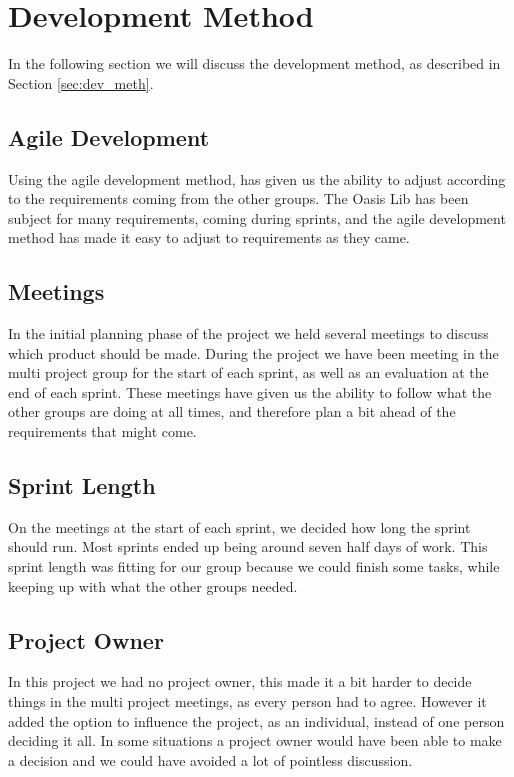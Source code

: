 \section{Development Method}
In the following section we will discuss the development method, as described in Section \vref{sec:dev_meth}.

\subsection{Agile Development}
Using the agile development method, has given us the ability to adjust according to the requirements coming from the other groups.
The Oasis Lib has been subject for many requirements, coming during sprints, and the agile development method has made it easy to adjust to requirements as they came.

\subsection{Meetings}
In the initial planning phase of the project we held several meetings to discuss which product should be made.
During the project we have been meeting in the multi project group for the start of each sprint, as well as an evaluation at the end of each sprint.
These meetings have given us the ability to follow what the other groups are doing at all times, and therefore plan a bit ahead of the requirements that might come.

\subsection{Sprint Length}
On the meetings at the start of each sprint, we decided how long the sprint should run.
Most sprints ended up being around seven half days of work.
This sprint length was fitting for our group because we could finish some tasks, while keeping up with what the other groups needed.

\subsection{Project Owner}
In this project we had no project owner, this made it a bit harder to decide things in the multi project meetings, as every person had to agree.
However it added the option to influence the project, as an individual, instead of one person deciding it all.
In some situations a project owner would have been able to make a decision and we could have avoided a lot of pointless discussion.